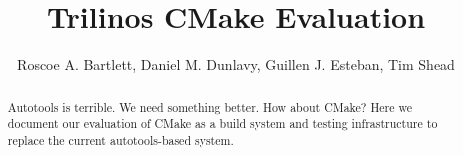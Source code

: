\documentclass[pdf,ps2pdf,11pt]{SANDreport}
\title{
Trilinos CMake Evaluation
}
\author{Roscoe A. Bartlett, Daniel M. Dunlavy, Guillen J. Esteban, Tim Shead}
\date{}
\begin{document}
\raggedright

\maketitle

%

%
\begin{abstract}
%
Autotools is terrible. We need something better.  How about CMake?
Here we document our evaluation of CMake as a build system and testing
infrastructure to replace the current autotools-based system.
%
\end{abstract}
%

%
%
%

%
\tableofcontents


\end{document}
